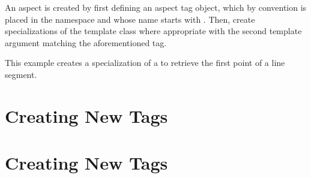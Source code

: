 An aspect is created by first defining an aspect tag object, which by convention is placed in the \vtkmexecarg{} namespace and whose name starts with .
Then, create specializations of the  template class where appropriate with the second template argument matching the aforementioned tag.

This example creates a specialization of a  to retrieve the first point of a line segment.




\section{Creating New \protect\controlsignature Tags}
\label{sec:NewControlSignatureTags}


\section{Creating New \protect\executionsignature Tags}
\label{sec:NewExecutionSignatureTags}
